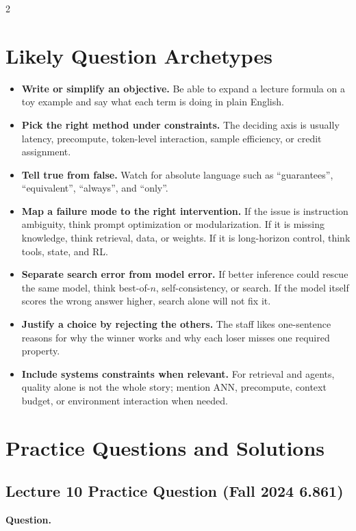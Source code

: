 \documentclass[10pt]{article}
\begin{document}
\begin{multicols*}{2}
\section*{Likely Question Archetypes}
\begin{itemize}
\item \textbf{Write or simplify an objective.} Be able to expand a lecture formula on a toy example and say what each term is doing in plain English.
\item \textbf{Pick the right method under constraints.} The deciding axis is usually latency, precompute, token-level interaction, sample efficiency, or credit assignment.
\item \textbf{Tell true from false.} Watch for absolute language such as ``guarantees'', ``equivalent'', ``always'', and ``only''.
\item \textbf{Map a failure mode to the right intervention.} If the issue is instruction ambiguity, think prompt optimization or modularization. If it is missing knowledge, think retrieval, data, or weights. If it is long-horizon control, think tools, state, and RL.
\item \textbf{Separate search error from model error.} If better inference could rescue the same model, think best-of-\(n\), self-consistency, or search. If the model itself scores the wrong answer higher, search alone will not fix it.
\item \textbf{Justify a choice by rejecting the others.} The staff likes one-sentence reasons for why the winner works and why each loser misses one required property.
\item \textbf{Include systems constraints when relevant.} For retrieval and agents, quality alone is not the whole story; mention ANN, precompute, context budget, or environment interaction when needed.
\end{itemize}

\end{multicols*}

\clearpage
\section*{Practice Questions and Solutions}
\footnotesize

\subsection*{Lecture 10 Practice Question (Fall 2024 6.861)}
\textbf{Question.}
\end{document}

